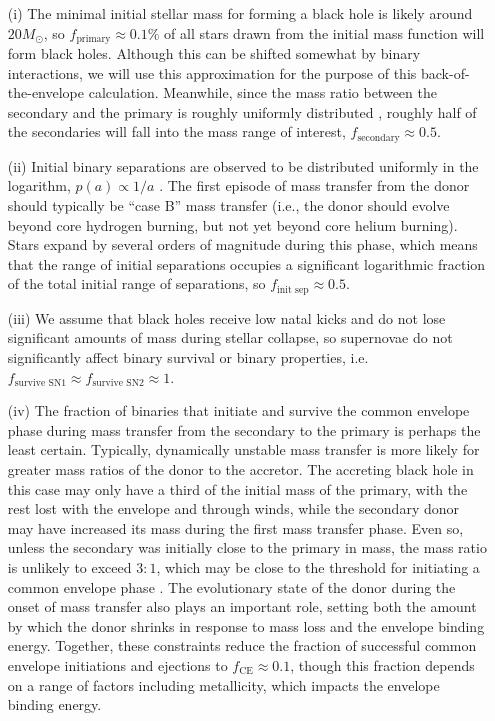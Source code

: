 \documentclass[review]{elsarticle}
\begin{document}
\begin{enumerate}
	\item[(i)] The minimal initial stellar mass for forming a black hole is likely around $20 M_\odot$, so $f_\textrm{primary} \approx 0.1\%$ of all stars drawn from the \citet{Kroupa:2002} initial mass function will form black holes. Although this can be shifted somewhat by binary interactions, we will use this approximation for the purpose of this back-of-the-envelope calculation. Meanwhile, since the mass ratio between the secondary and the primary is roughly uniformly distributed \citep{Sana:2012,MoeDiStefano:2017}, roughly half of the secondaries will fall into the mass range of interest, $f_\textrm{secondary} \approx 0.5$.  

\item[(ii)] Initial binary  separations are observed to be distributed uniformly in the logarithm, $p(a) \propto 1/a$ \citep{Opik:1924}.  The first episode of mass transfer from the donor should typically be ``case B'' mass transfer (i.e., the donor should evolve beyond core hydrogen burning, but not yet beyond core helium burning).  Stars expand by several orders of magnitude during this phase, which means that the range of initial separations occupies a significant logarithmic fraction of the total initial range of separations, so $f_\textrm{init sep} \approx 0.5$.  

\item[(iii)]  We assume that black holes receive low natal kicks and do not lose significant amounts of mass during stellar collapse, so supernovae do not significantly affect binary survival or binary properties, i.e. $f_\textrm{survive SN1} \approx f_\textrm{survive SN2} \approx 1$.  

\item[(iv)] The fraction of binaries that initiate and survive the common envelope phase during mass transfer from the secondary to the primary is perhaps the least certain.  Typically, dynamically unstable mass transfer is more likely for greater mass ratios of the donor to the accretor.  The accreting black hole in this case may only have a third of the initial mass of the primary, with the rest lost with the envelope and through winds, while the secondary donor may have increased its mass during the first mass transfer phase.  Even so, unless the secondary was initially close to the primary in mass, the mass ratio is unlikely to exceed $3:1$, which may be close to the threshold for initiating a common envelope phase \citep[e.g.,][]{Claeys:2014}.  The evolutionary state of the donor during the onset of mass transfer also plays an important role, setting both the amount by which the donor shrinks in response to mass loss and the envelope binding energy.  Together, these constraints reduce the fraction of successful common envelope initiations and ejections to $f_\textrm{CE} \approx 0.1$, though this fraction depends on a range of factors including metallicity, which impacts the envelope binding energy.   


\end{enumerate}
\end{document}
